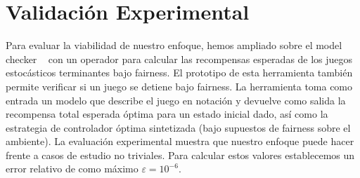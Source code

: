 \section{Validación Experimental} \label{sec:experimental_eval_fair}


Para evaluar la viabilidad de nuestro enfoque, hemos ampliado sobre el model checker {\Prism}~\cite{DBLP:conf/cav/KwiatkowskaN0S20,DBLP:conf/cav/KwiatkowskaNP11} con un operador para calcular las recompensas esperadas de los juegos estocásticos terminantes bajo fairness. El prototipo de esta herramienta también permite verificar si un juego se detiene bajo fairness.
La herramienta toma como entrada un modelo que describe el juego en notación {\Prism} y devuelve como salida
la recompensa total esperada óptima para un estado inicial dado, así como la estrategia de controlador óptima sintetizada (bajo supuestos de fairness sobre el ambiente).
La evaluación experimental muestra que nuestro enfoque puede hacer frente a casos de estudio no triviales. Para calcular estos valores establecemos un error relativo de como máximo $\varepsilon = 10^{-6}$.


